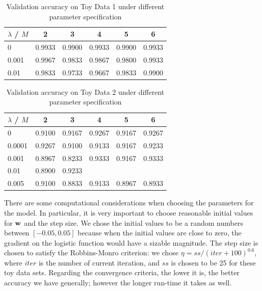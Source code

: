 \begin{table}[h!]
\centering
\caption{Validation accuracy on Toy Data 1 under different parameter specification}\label{tab:toy_1_cv}
\begin{tabular}{ lccccc }
\hline\hline
$\lambda$ / $M$ 		& 2 		& 3			&4			&5		&6\\
\hline
0 				& 0.9933    & 0.9900    & 0.9933   &  0.9900  &   0.9933\\
0.001 			& 0.9967    & 0.9833    & 0.9867    & 0.9800   &  0.9933\\
0.01				& 0.9833    & 0.9733    & 0.9667    & 0.9833   & 0.9900\\
\hline\hline
\end{tabular}
\end{table}
         
         
\begin{table}[h!]
\centering
\caption{Validation accuracy on Toy Data 2 under different parameter specification}\label{tab:toy_2_cv}
\begin{tabular}{ lccccc }
\hline\hline
$\lambda$ / $M$ 		& 2 		& 3			&4			&5		&6\\
\hline         
0        & 0.9100    & 0.9167    & 0.9267    & 0.9167    & 0.9267\\
0.0001   & 0.9267  	& 0.9100 	& 0.9133   &  0.9167   & 0.9233\\
0.001    & 0.8967    & 0.8233    & 0.9333    & 0.9167    & 0.9333\\
0.01								& 0.8900   & 0.9233\\
0.005	& 0.9100    &  0.8833    & 0.9133   & 0.8967    & 0.8933\\
\hline\hline
\end{tabular}
\end{table}


There are some computational considerations when choosing the parameters for the model. In particular, it is very important to choose reasonable initial values for $\boldsymbol{\mathbf{w}}$ and the step size. We chose the initial values to be a random numbers between $[-0.05, 0.05]$ because when the initial values are close to zero, the gradient on the logistic function would have a sizable magnitude. The step size is chosen to satisfy the Robbins-Monro criterion: we chose $\eta = ss/(iter + 100)^{0.6}$, where $iter$ is the number of current iteration, and $ss$ is chosen to be 25 for these toy data sets. Regarding the convergence criteria, the lower it is, the better accuracy we have generally; however the longer run-time it takes as well.


